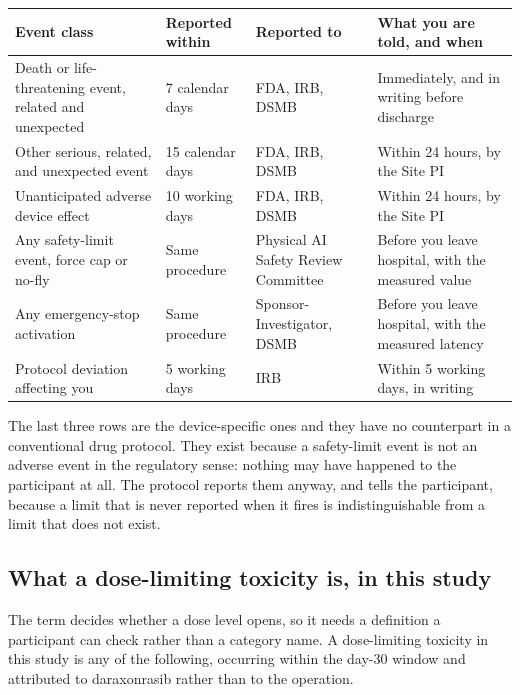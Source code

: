 \noindent\begin{tabularx}{\textwidth}{L{4.3cm} C{2.1cm} L{3.2cm} Y}
\toprule
\textbf{Event class} & \textbf{Reported within} & \textbf{Reported to} & \textbf{What you are told, and when} \\
\midrule
Death or life-threatening event, related and unexpected & 7 calendar days & FDA, IRB, DSMB & Immediately, and in writing before discharge \\
Other serious, related, and unexpected event & 15 calendar days & FDA, IRB, DSMB & Within 24 hours, by the Site PI \\
Unanticipated adverse device effect & 10 working days & FDA, IRB, DSMB & Within 24 hours, by the Site PI \\
Any safety-limit event, force cap or no-fly & Same procedure & Physical AI Safety Review Committee & Before you leave hospital, with the measured value \\
Any emergency-stop activation & Same procedure & Sponsor-Investigator, DSMB & Before you leave hospital, with the measured latency \\
Protocol deviation affecting you & 5 working days & IRB & Within 5 working days, in writing \\
\bottomrule
\end{tabularx}

\vspace{0.30em}

\noindent The last three rows are the device-specific ones and they have no
counterpart in a conventional drug protocol. They exist because a safety-limit
event is not an adverse event in the regulatory sense: nothing may have happened
to the participant at all. The protocol reports them anyway, and tells the
participant, because a limit that is never reported when it fires is
indistinguishable from a limit that does not exist.

\subsection{What a dose-limiting toxicity is, in this study}

The term decides whether a dose level opens, so it needs a definition a
participant can check rather than a category name. A dose-limiting toxicity in
this study is any of the following, occurring within the day-30 window and
attributed to daraxonrasib rather than to the operation.

\vspace{0.30em}

